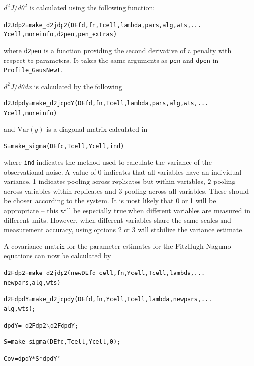 \documentclass{article}
\newcommand{\Var}   {\ensuremath{\mathrm{Var}}}
\newcommand{\bh}    {\backslash}
\newcommand{\nt}    {\noindent}
\begin{document}
\nt $d^2J/d\theta^2$ is calculated using the following function:

\begin{alltt}
   d2Jdp2 = make_d2jdp2(DEfd,fn,Tcell,lambda,pars,alg,wts,...
       Ycell,moreinfo,d2pen,pen_extras)
\end{alltt}

\nt where {\tt d2pen} is a function providing the second
derivative of a penalty with respect to parameters. It
takes the same arguments as {\tt pen} and {\tt dpen} in
\\ {\tt Profile\_GausNewt}.

$d^2J/d\theta dx$ is calculated by the following

\begin{alltt}
   d2Jdpdy = make_d2jdpdY(DEfd,fn,Tcell,lambda,pars,alg,wts,...
      Ycell,moreinfo)
\end{alltt}

\nt and $\Var(y)$ is a diagonal matrix calculated in

\begin{alltt}
    S = make_sigma(DEfd,Tcell,Ycell,ind)
\end{alltt}

\nt where {\tt ind} indicates the method used to calculate the variance of the observational noise.
A value of 0 indicates that all variables have an individual variance, 1 indicates pooling across
replicates but within variables, 2 pooling across variables within replicates and 3 pooling across
all variables. These should be chosen according to the system. It is most likely that 0 or 1 will
be appropriate -- this will be especially true when different variables are measured in different
units. However, when different variables share the same scales and measurement accuracy, using
options 2 or 3 will stabilize the variance estimate.

A covariance matrix for the parameter estimates for the
FitzHugh-Nagumo equations can now be calculated by

\begin{alltt}
   d2Fdp2 = make_d2jdp2(newDEfd_cell,fn,Ycell,Tcell,lambda,...
       newpars,alg,wts)

   d2FdpdY = make_d2jdpdy(DEfd,fn,Ycell,Tcell,lambda,newpars,...
       alg,wts);

   dpdY = -d2Fdp2\(\bh\)d2FdpdY;

   S = make_sigma(DEfd,Tcell,Ycell,0);

   Cov = dpdY * S * dpdY'
\end{alltt}
\end{document}
